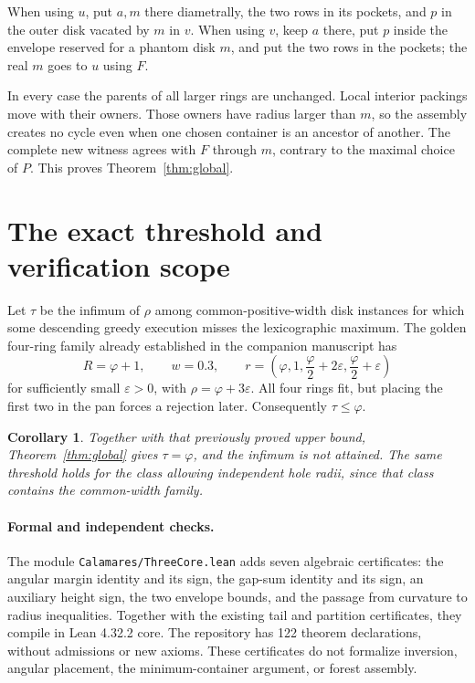 \documentclass[11pt]{article}
\newtheorem{corollary}[theorem]{Corollary}
\theoremstyle{remark}
\newcommand{\ph}{\varphi}
\begin{document}
When using $u$, put $a,m$ there diametrally, the two rows in its
pockets, and $p$ in the outer disk vacated by $m$ in $v$. When using
$v$, keep $a$ there, put $p$ inside the envelope reserved for a phantom
disk $m$, and put the two rows in the pockets; the real $m$ goes to
$u$ using $F$.

In every case the parents of all larger rings are unchanged. Local
interior packings move with their owners. Those owners have radius
larger than $m$, so the assembly creates no cycle even when one chosen
container is an ancestor of another. The complete new witness agrees
with $F$ through $m$, contrary to the maximal choice of $P$. This proves
Theorem~\ref{thm:global}.

\section{The exact threshold and verification scope}

Let $\tau$ be the infimum of $\rho$ among common-positive-width disk
instances for which some descending greedy execution misses the
lexicographic maximum. The golden four-ring family already established
in the companion manuscript \cite[the theorem labelled
\texttt{thm:golden} in the source]{companion} has
\[
 R=\ph+1,\qquad w=0.3,\qquad
 r=\left(\ph,1,\frac\ph2+2\varepsilon,
                      \frac\ph2+\varepsilon\right)
\]
for sufficiently small $\varepsilon>0$, with
$\rho=\ph+3\varepsilon$. All four rings fit, but placing the first
two in the pan forces a rejection later. Consequently $\tau\le\ph$.

\begin{corollary}
Together with that previously proved upper bound,
Theorem~\ref{thm:global} gives $\tau=\ph$, and the infimum is not
attained. The same threshold holds for the class allowing independent
hole radii, since that class contains the common-width family.
\end{corollary}

\paragraph{Formal and independent checks.}
The module \texttt{Calamares/ThreeCore.lean} adds seven algebraic
certificates: the angular margin identity and its sign, the gap-sum
identity and its sign, an auxiliary height sign, the two envelope
bounds, and the passage from curvature to radius inequalities. Together
with the existing tail and partition certificates, they compile in
Lean 4.32.2 core. The repository has 122 theorem declarations, without
admissions or new axioms. These certificates do not formalize inversion,
angular placement, the minimum-container argument, or forest assembly.
\end{document}
